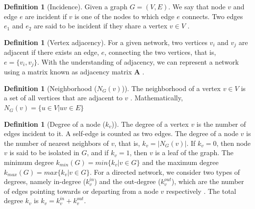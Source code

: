 \documentclass[10pt,a4paper]{article}
\theoremstyle{plain}
\theoremstyle{definition}
\newtheorem{lem}[subsection]{Lemma}
\newtheorem{defn}[subsection]{Definition}
\begin{document}
\begin{defn}[Incidence]
	Given a graph $G=(V,E)$. We say that node $v$ and edge $e$ are incident if $v$ is one of the nodes to which edge $e$ connects. Two edges $e_1$ and $e_2$ are said to be incident if they share a vertex $v\in V$ \citep{newman2010networks}. \\
\end{defn}

\begin{defn}[Vertex adjacency]
	For a given network, two vertices $v_i$ and $v_j$ are adjacent if there exists an edge, $e$, connecting the two vertices, that is, $e = \{v_i,v_j\}$. With the understanding of adjacency, we can represent a network using a matrix known as adjacency matrix $\mathbf{A}$ \citep{newman2010networks}.\\
\end{defn}

\begin{defn}[Neighborhood ($N_G(v)$)]
	The neighborhood of a vertex $v \in V$ is a set of all vertices that are adjacent to $v$ \citep{newman2010networks}. Mathematically, $N_G(v) = \{u \in V \vert uv \in E \}$\\
\end{defn}

\begin{defn}[Degree of a node ($k_v$)]
	The degree of a vertex $v$ is the number of edges incident to it. A self-edge is counted as two edges. The degree of a node $v$ is the number of nearest neighbors of $v$, that is, $k_v = |N_G(v)|$. If $k_v = 0$, then node $v$ is said to be isolated in $G$, and if $k_v = 1$, then $v$ is a leaf of the graph. The minimum degree $k_{min}(G)= min\{k_v \vert v \in G\} $ and the maximum degree $k_{max}(G)= max\{k_v \vert v \in G\}$. For a directed network, we consider two types of degrees, namely in-degree ($k_v^{in}$) and the out-degree ($k_v^{out}$), which are the number of edges pointing towards or departing from a node $v$ respectively \citep{estrada2011structure}. The total degree $k_v$ is $k_v = k_v^{in}+ k_v^{out}$.\\
\end{defn} 

\end{document}
